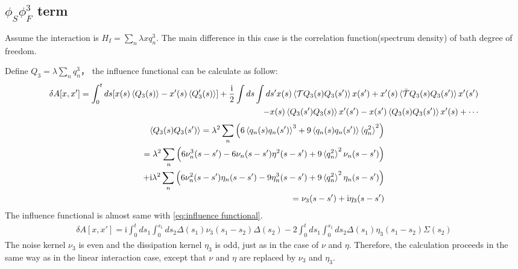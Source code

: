 \documentclass{article}
\renewcommand{\I}[0]{\mathrm{i}}
\begin{document}
\subsection{$\phi_S\phi_F^3$ term}
Assume the interaction is $H_I=\sum_n \lambda x q_n^3$. The main difference in this case is the correlation function(spectrum density) of bath degree of freedom.  

Define $Q_3=\lambda\sum_n q_n^3$， the influence functional can be calculate as follow:
 \begin{equation}
        \begin{split}
             \delta A[x,x']=\int_0^t ds  [x(s)\braket{Q_3(s)}-x'(s)\braket{Q_3'(s)}]+\frac{\mathrm{i}}{2}\int ds\int ds' x(s)\braket{\mathcal{T}Q_3(s)Q_3(s')}x(s')+x'(s)\braket{\bar{\mathcal{T}}Q_3(s)Q_3(s')}x'(s')\\
        -x(s)\braket{Q_3(s')Q_3(s)}x'(s')-x(s')\braket{Q_3(s)Q_3(s')}x'(s)+\cdots\label{eq:influence functional in xq^3}
        \end{split}
    \end{equation}
    \begin{equation}
        \begin{split}    \braket{Q_3(s)Q_3(s')}=\lambda^2\sum_n\left(6\braket{q_n(s)q_n(s')}^3+9\braket{q_n(s)q_n(s')}\braket{q_n^2}^2\right)\\
        =\lambda^2\sum_n\left(6\nu^3_n(s-s')-6\nu_n(s-s')\eta^2(s-s')+9\braket{q_n^2}^2\nu_n(s-s')\right)\\
        +\I\lambda^2\sum_n\left(6\nu_n^2(s-s')\eta_n(s-s')-9\eta_n^3(s-s')+9\braket{q_n^2}^2\eta_n(s-s')\right)\\
        =\nu_3(s-s')+\I\eta_3(s-s')
        \end{split}
    \end{equation}
    The influence functional is almost same with \eqref{eq:influence functional}.
    \begin{equation}
        \begin{split}
             \delta A[x,x']
        =\mathrm{i}\int_0^t ds_1\int_0^{s_1}ds_2\Delta(s_1)\nu_3(s_1-s_2)\Delta(s_2)-2\int_0^t ds_1\int_0^{s_1}ds_2\Delta(s_1)\eta_3(s_1-s
        _2)\Sigma(s_2)\label{eq:influence functional xQ3}
        \end{split}
    \end{equation}
The noise kernel $\nu_3$ is even and the dissipation kernel $\eta_3$ is odd, just as in the case of $\nu$ and $\eta$. Therefore, the calculation proceeds in the same way as in the linear interaction case, except that $\nu$ and $\eta$ are replaced by $\nu_3$ and $\eta_3$.
\end{document}

